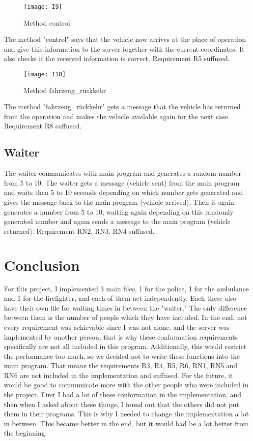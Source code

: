 \documentclass{article}
\begin{document}
\begin{figure}[htp]
    \centering
\texttt{[image: I9]}
   \caption{Method control}
    \label{fig:GALAXY}
\end{figure}
\newline
\newline
The method "control" says that the vehicle now arrives at the place of operation and give this information to the server together with the current coordinates. It also checks if the received information is correct. Requirement R5 suffused.


\begin{figure}[htp]
    \centering
\texttt{[image: I10]}
   \caption{Method fahrzeug\_rückkehr}
    \label{fig:GALAXY}
\end{figure}

The method "fahrzeug\_rückkehr" gets a message that the vehicle has returned from the operation and makes the vehicle available again for the next case.  Requirement R8 suffused.

\subsection{Waiter}
The waiter communicates with main program and generates a random number from 5 to 10. The waiter gets a message (vehicle sent) from the main program and waits then 5 to 10 seconds depending on which number gets generated and gives the message back to the main program (vehicle arrived). Then it again generates a number from 5 to 10, waiting again depending on this  randomly generated number and again sends a message to the main program (vehicle returned).  Requirement RN2, RN3, RN4  suffused.

\section{Conclusion}
For this project, I implemented 3 main files, 1 for the police, 1 for the ambulance and 1 for the firefighter, and each of them act independently.
\newline
Each these also have their own file for waiting times in between the "waiter."  The only difference between them is the number of people which they have included. 
\newline
In the end, not every requirement was achievable since I was not alone, and the server was implemented by another person; that is why these conformation requirements specifically are not all included in this program.
Additionally, this would restrict the performance too much, so we decided not to write these functions into the main program. That means the requirements R3, R4, R5, R6, RN1, RN5 and RN6 are not included in the implementation and suffused.
\newline
For the future, it would be good to communicate more with the other people who were included in the project. First I had a lot of these conformation in the implementation, and then when I asked about these things, I found out that the others did not put them in their programs. This is why I needed to change the implementation a lot in between. This became better in the end, but it would had be a lot better from the beginning.
\end{document}
